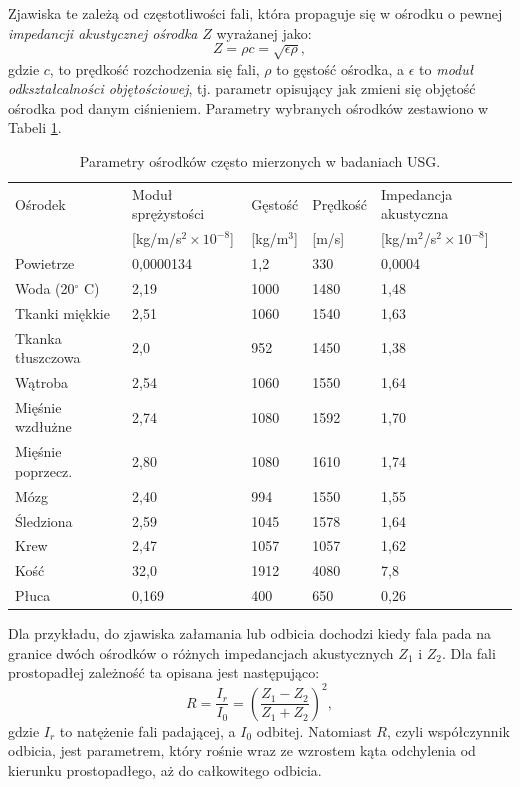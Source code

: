 Zjawiska te zależą od częstotliwości fali, która propaguje się w ośrodku o pewnej \textit{impedancji akustycznej ośrodka} $Z$ wyrażanej jako:
\begin{equation}
Z = \rho c = \sqrt{\epsilon \rho},
\end{equation}
gdzie $c$, to prędkość rozchodzenia się fali, $\rho$ to gęstość ośrodka, a $\epsilon$ to \textit{moduł odkształcalności objętościowej}, tj. parametr opisujący jak zmieni się objętość ośrodka pod danym ciśnieniem. Parametry wybranych ośrodków zestawiono w Tabeli \ref{tab:USG-params}. 
\renewcommand{\arraystretch}{1.2}
\begin{table}[h!]
	\setlength{\tabcolsep}{14pt}
	\centering
	\caption{Parametry ośrodków często mierzonych w badaniach USG.}
	\scriptsize
	\label{tab:USG-params}
	\begin{tabular}{l | l | l | l | l }
		Ośrodek  & Moduł sprężystości  & Gęstość  & Prędkość  & Impedancja akustyczna  \\  
		& [kg/m/s$^2\times10^{-8}$] & [kg/m$^3$] & [m/s] & [kg/m$^2$/s$^2\times10^{-8}$] \\ \hline \hline
		Powietrze   & 0,0000134 & 1,2 & 330 & 0,0004 \\ \hline
		Woda (20$^\circ$ C) & 2,19 & 1000 & 1480 & 1,48  \\ \hline
		Tkanki miękkie & 2,51 & 1060 & 1540 & 1,63  \\ \hline
		Tkanka tłuszczowa & 2,0 & 952 & 1450 & 1,38  \\ \hline
		Wątroba & 2,54 & 1060 & 1550 & 1,64  \\ \hline
		Mięśnie wzdłużne & 2,74 & 1080 & 1592 & 1,70  \\ \hline
		Mięśnie poprzecz. & 2,80 & 1080 & 1610 & 1,74  \\ \hline
		Mózg & 2,40 & 994 & 1550 & 1,55  \\ \hline
		Śledziona & 2,59 & 1045 & 1578 & 1,64  \\ \hline
		Krew & 2,47 & 1057 & 1057 & 1,62  \\ \hline
		Kość & 32,0 & 1912 & 4080 & 7,8  \\ \hline
		Płuca & 0,169 & 400 & 650 & 0,26  \\ \hline
	\end{tabular}
\end{table}
\renewcommand{\arraystretch}{1}
Dla przykładu, do zjawiska załamania lub odbicia dochodzi kiedy fala pada na granice dwóch ośrodków o różnych impedancjach akustycznych $Z_1$ i $Z_2$. Dla fali prostopadłej zależność ta opisana jest następująco:
\begin{equation}
R = \frac{I_r}{I_0} = \left(\frac{Z_1-Z_2}{Z_1+Z_2}\right)^2,
\end{equation}
gdzie $I_r$ to natężenie fali padającej, a $I_0$ odbitej. Natomiast $R$, czyli współczynnik odbicia, jest parametrem, który rośnie wraz ze wzrostem kąta odchylenia od kierunku prostopadłego, aż do całkowitego odbicia.

